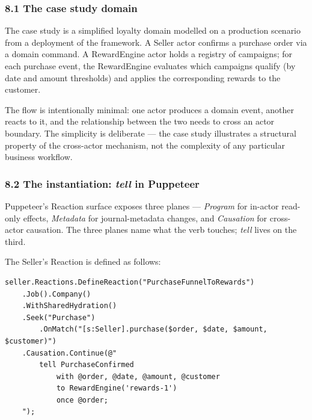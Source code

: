 \documentclass[
]{article}
\begin{document}
\subsubsection{8.1 The case study domain}\label{the-case-study-domain}

The case study is a simplified loyalty domain modelled on a production
scenario from a deployment of the framework. A Seller actor confirms a
purchase order via a domain command. A RewardEngine actor holds a
registry of campaigns; for each purchase event, the RewardEngine
evaluates which campaigns qualify (by date and amount thresholds) and
applies the corresponding rewards to the customer.

The flow is intentionally minimal: one actor produces a domain event,
another reacts to it, and the relationship between the two needs to
cross an actor boundary. The simplicity is deliberate --- the case study
illustrates a structural property of the cross-actor mechanism, not the
complexity of any particular business workflow.

\subsubsection{\texorpdfstring{8.2 The instantiation: \emph{tell} in
Puppeteer}{8.2 The instantiation: tell in Puppeteer}}\label{the-instantiation-tell-in-puppeteer}

Puppeteer's Reaction surface exposes three planes --- \emph{Program} for
in-actor read-only effects, \emph{Metadata} for journal-metadata
changes, and \emph{Causation} for cross-actor causation. The three
planes name what the verb touches; \emph{tell} lives on the third.

The Seller's Reaction is defined as follows:

\begin{verbatim}
seller.Reactions.DefineReaction("PurchaseFunnelToRewards")
    .Job().Company()
    .WithSharedHydration()
    .Seek("Purchase")
        .OnMatch("[s:Seller].purchase($order, $date, $amount, $customer)")
    .Causation.Continue(@"
        tell PurchaseConfirmed
            with @order, @date, @amount, @customer
            to RewardEngine('rewards-1')
            once @order;
    ");
\end{verbatim}
\end{document}
